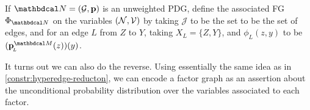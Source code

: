 \documentclass{article}
\begin{document}
	\begin{defn}\label{def:PDG2fg}
	If $\dg N = (\Gr, \mat p)$ is an unweighted PDG, define   
	the associated FG $\FGof{\dg N}$ on the 
	variables $(\mathcal N,\mathcal V)$ by
	taking $\mathcal J$ to be the set to be the set of edges, 
	and for an edge $L$ from $Z$ to $Y$, taking $X_{L} = \{Z,Y\}$, and $\phi_L(z,y)$ to be $(\bp^{\dg M}(z))(y)$.
	\end{defn}
	
	
	It turns out we can also do the reverse. 
	Using essentially the same idea as in \cref{constr:hyperedge-reducton},
	we can encode a factor graph as an assertion about the unconditional
	probability distribution over the variables associated to each
	factor.  
	
\end{document}
